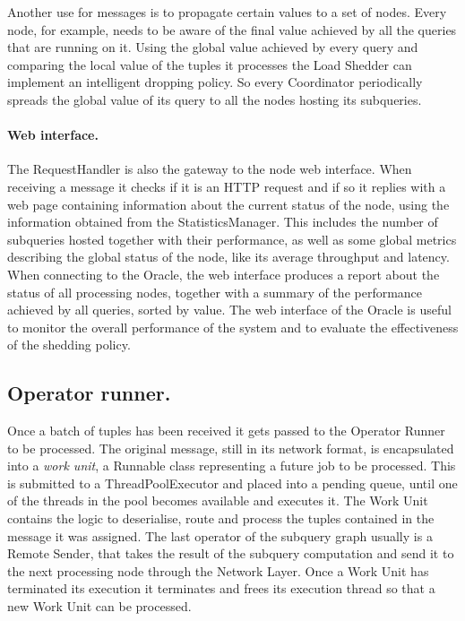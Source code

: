 Another use for messages is to propagate certain values to a set of nodes. Every node, for example,
needs to be aware of the final \sic value achieved by all the queries that are running on it. Using the
global \sic value achieved by every query and comparing the local value of the tuples it processes the
Load Shedder can implement an intelligent dropping policy. So every Coordinator periodically spreads the
global \sic value of its query to all the nodes hosting its subqueries.

\paragraph{Web interface.}
The RequestHandler is also the gateway to the node web interface. When receiving a message it checks if
it is an HTTP request and if so it replies with a web page containing information about the current
status of the node, using the information obtained from the StatisticsManager. This includes the number
of subqueries hosted together with their performance, as well as some global metrics describing the
global status of the node, like its average throughput and latency.
When connecting to the Oracle, the web interface produces a report about the status of all processing
nodes, together with a summary of the performance achieved by all queries, sorted by \sic value. The web
interface of the Oracle is useful to monitor the overall performance of the system and to evaluate the
effectiveness of the shedding policy. 

\subsection{Operator runner.}

Once a batch of tuples has been received it gets passed to the Operator Runner to be processed. The
original message, still in its network format, is encapsulated into a \emph{work unit}, a Runnable class
representing a future job to be processed. This is submitted to a ThreadPoolExecutor and placed into a
pending queue, until one of the threads in the pool becomes available and executes it. The Work Unit
contains the logic to deserialise, route and process the tuples contained in the message it was
assigned. The last operator of the subquery graph usually is a Remote Sender, that takes the result of
the subquery computation and send it to the next processing node through the Network Layer. Once a Work
Unit has terminated its execution it terminates and frees its execution thread so that a new Work Unit
can be processed.

